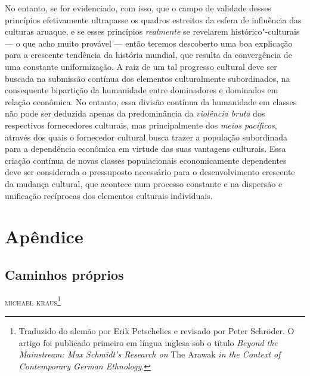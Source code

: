 No entanto, se for evidenciado, com isso, que o campo de validade desses
princípios efetivamente ultrapasse os quadros estreitos da esfera de
influência das culturas aruaque, e se esses princípios \textit{realmente} se
revelarem histórico"-culturais --- o que acho muito provável --- então teremos 
descoberto uma boa explicação para a crescente tendência da
história mundial, que resulta da convergência de uma constante
uniformização. A raiz de um tal progresso cultural deve ser buscada na
submissão contínua dos elementos culturalmente subordinados, na
consequente bipartição da humanidade entre dominadores e dominados em
relação econômica. No entanto, essa divisão contínua da humanidade em
classes não pode ser deduzida apenas da predominância da \textit{violência bruta}
dos respectivos fornecedores culturais, mas principalmente dos
\textit{meios pacíficos}, através dos quais o fornecedor cultural busca trazer a
população subordinada para a dependência econômica em virtude das suas
vantagens culturais. Essa criação contínua de novas classes
populacionais economicamente dependentes deve ser considerada o
pressuposto necessário para o desenvolvimento crescente da mudança
cultural, que acontece num processo constante e na dispersão e
unificação recíprocas dos elementos culturais individuais.

\part{Apêndice}

\chapter*{Caminhos próprios\smallskip{}}


\begin{flushright}
\textsc{michael kraus}\footnote{Traduzido do  alemão por Erik Petschelies e revisado por Peter Schröder. O artigo foi publicado primeiro em língua inglesa sob o título \textit{Beyond the Mainstream: Max Schmidt's Research on} The Arawak \textit{in the Context of Contemporary German Ethnology}.} 
\end{flushright}

